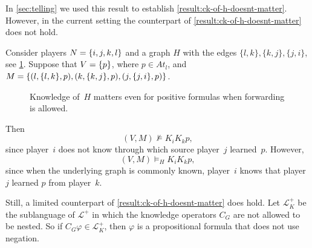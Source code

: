 \documentclass{article}
\newcounter{#1}
\newcommand{\state}[1][]{\ensuremath{(V#1,M#1)}\xspace}
\newcommand{\bits}{\ensuremath{At}\xspace}
\newcommand{\knows}[1]{\ensuremath{K_{#1}}\xspace}
\newcommand{\ck}[1]{\ensuremath{C_{#1}}\xspace}\newcommand{\Facts}{\mathit{Facts}}
\begin{document}
In \cref{sec:telling} we used this result to
establish \cref{result:ck-of-h-doesnt-matter}.  However, in the
current setting the counterpart of \cref{result:ck-of-h-doesnt-matter} does not hold.

\begin{example}
  \label{ex:ck-of-h-does-matter}
  Consider players $N = \mbox{$\{{i,j,k,l}\}$}$ and a graph $H$
  with the edges $\{l,k\}, \{k,j\}, \{j,i\}$,
see \cref{fig:line}. Suppose that
  $V = \mbox{$\{{p}\}$}$, where $p \in \bits_l$, and $M = \mbox{$\{{(l,\mbox{$\{{l,k}\}$},p), (k,\mbox{$\{{k,j}\}$},p), (j,\mbox{$\{{j,i}\}$},p)}\}$}$.
  \begin{figure}
    \centering
    \endpgfgraphicnamed
    \caption{Knowledge of~$H$ matters even for positive formulas when forwarding is allowed.}
    \label{fig:line}
  \end{figure}
  Then
  \[
  \state \nvDash \knows i \knows k p,
  \]
  since player~$i$ does not know through which source player~$j$ learned~$p$. However, 
  \[
  \state \vDash_H \knows i \knows k p,
  \]
  since when the underlying graph is commonly known,
  player~$i$ knows that player~$j$ learned $p$ from player~$k$.
\end{example}

Still, a limited counterpart of \cref{result:ck-of-h-doesnt-matter} does hold.
Let $\mathcal{L}^{+}_{K}$ be the sublanguage of $\mathcal{L}^{+}$ in which
the knowledge operators $\ck G$ are not allowed to be nested. So if $\ck G
\varphi \in \mathcal{L}^{+}_{K}$, then $\varphi$ is a propositional
formula that does not use negation.
\end{document}
